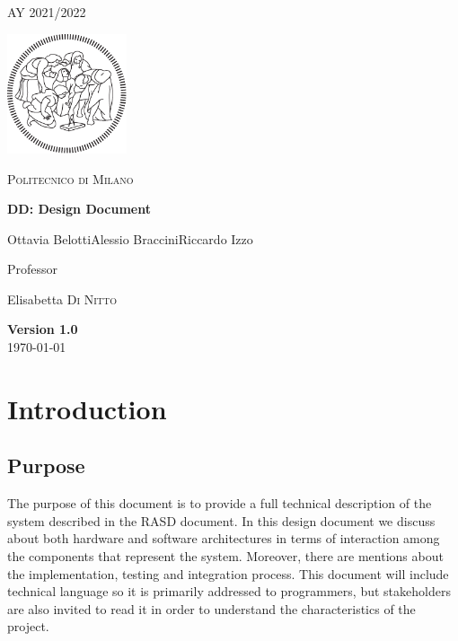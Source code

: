 \documentclass[table, 12pt]{article}
\begin{document}
\begin{titlepage}
    \centering
    {\scshape\large AY 2021/2022 \par}
    \vfill
    \includegraphics[width=100pt]{assets/logo-polimi-new}\par\vspace{1cm}
    {\scshape\LARGE Politecnico di Milano \par}
    \vspace{1.5cm}
    {\huge\bfseries DD\@: Design Document \par}
    \vspace{2cm}
    {\Large {Ottavia Belotti\quad Alessio Braccini\quad Riccardo Izzo}\par}
    \vfill
    {\large Professor\par
        Elisabetta \textsc{Di Nitto}}
    \vfill
    {\large \textbf{Version 1.0}\\ \today \par}
\end{titlepage}


\thispagestyle{plain}
\mbox{}
\newpage
{}
\tableofcontents
\newpage
{}

\section{Introduction}


\subsection{Purpose}
The purpose of this document is to provide a full technical description of the system described in the RASD document.
In this design document we discuss about both hardware and software architectures in terms of interaction among the components that represent the system.
Moreover, there are mentions about the implementation, testing and integration process.
This document will include technical language so it is primarily addressed to programmers, but stakeholders are also invited to read it in order to understand the characteristics of the project.
\end{document}
